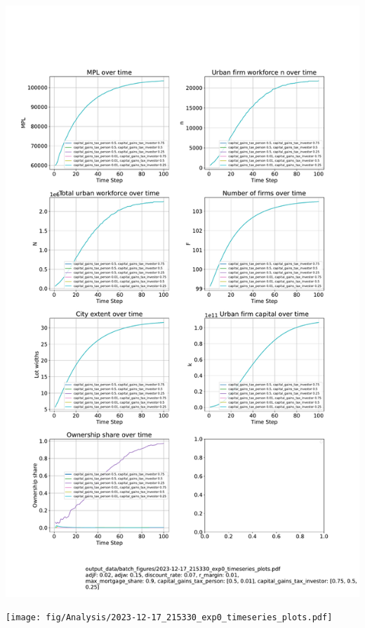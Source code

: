 \documentclass{article}
\begin{document}
\includegraphics[trim= 1.5cm 5cm 2cm 6.5cm, clip, scale=.45]{fig/Analysis/215330-exp0-timeseries-plots.pdf}


 \texttt{[image: fig/Analysis/2023-12-17\_215330\_exp0\_timeseries\_plots.pdf]}

 
\end{document}

